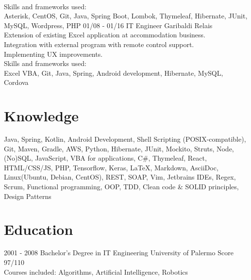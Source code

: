 \documentclass[]{friggeri-cv}
\begin{document}
\begin{entrylist}
{    {\\Skills and frameworks used:\\Asterisk, CentOS, Git, Java, Spring Boot, Lombok, Thymeleaf, Hibernate, JUnit, MySQL, Wordpress, PHP}}
  \entry
    {01/08 - 01/16}
    {IT Engineer}
    {Garibaldi Relais}
    {{\\Extension of existing Excel application at accommodation business.}
    {\\Integration with external program with remote control support.}
    {\\Implementing UX improvements.}
    {\\Skills and frameworks used:\\Excel VBA, Git, Java, Spring, Android development, Hibernate, MySQL, Cordova}}
\end{entrylist}
\newpage

\section{Knowledge}
{Java, Spring, Kotlin, Android Development, Shell Scripting {\tiny(POSIX-compatible)}, Git, Maven, Gradle, AWS, Python, Hibernate, JUnit, Mockito, Struts, Node, {\tiny(No)}SQL, JavaScript, VBA for applications, C\#, Thymeleaf, React, HTML/CSS/JS, PHP, Tensorflow, Keras, \LaTeX, Markdown, AsciiDoc, Linux{\tiny(Ubuntu, Debian, CentOS)}, REST, SOAP, Vim, Jetbrains IDEs, Regex, Scrum, Functional programming, OOP, TDD, Clean code \& SOLID principles, Design Patterns}

\section{Education}
\begin{entrylist}
  \entry
    {2001 - 2008}
    {Bachelor's Degree in IT Engineering}
    {University of Palermo}
    {Score 97/110\\
    Courses included: Algorithms, Artificial Intelligence, Robotics}
\end{entrylist}
\end{document}
